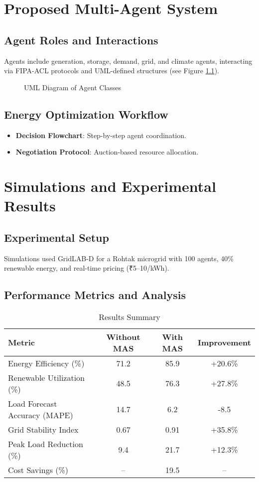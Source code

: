 \documentclass[12pt, a4paper, oneside]{book}
\begin{document}
\chapter{Proposed Multi-Agent System}
\section{Agent Roles and Interactions}
Agents include generation, storage, demand, grid, and climate agents, interacting via FIPA-ACL protocols and UML-defined structures (see Figure \ref{fig:agent_uml}).
\begin{figure}[h]
    \centering
    \caption{UML Diagram of Agent Classes}
    \label{fig:agent_uml}
\end{figure}

\section{Energy Optimization Workflow}
\begin{itemize}
    \item \textbf{Decision Flowchart}: Step-by-step agent coordination.
    \item \textbf{Negotiation Protocol}: Auction-based resource allocation.
\end{itemize}

\chapter{Simulations and Experimental Results}
\section{Experimental Setup}
Simulations used GridLAB-D for a Rohtak microgrid with 100 agents, 40\% renewable energy, and real-time pricing (₹5–10/kWh).

\section{Performance Metrics and Analysis}
\begin{table}[h]
    \centering
    \caption{Results Summary}
    \begin{tabular}{lccc}
        \toprule
        \textbf{Metric} & \textbf{Without MAS} & \textbf{With MAS} & \textbf{Improvement} \\
        \midrule
        Energy Efficiency (\%) & 71.2 & 85.9 & +20.6\% \\
        Renewable Utilization (\%) & 48.5 & 76.3 & +27.8\% \\
        Load Forecast Accuracy (MAPE) & 14.7 & 6.2 & -8.5 \\
        Grid Stability Index & 0.67 & 0.91 & +35.8\% \\
        Peak Load Reduction (\%) & 9.4 & 21.7 & +12.3\% \\
        Cost Savings (\%) & – & 19.5 & – \\
        \bottomrule
    \end{tabular}
\end{table}
\end{document}
